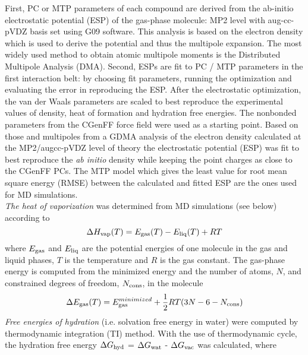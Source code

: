 \documentclass[journal=jacsat,manuscript=article]{achemso}
\begin{document}
 \noindent
 First, PC or MTP parameters of each compound are derived from the ab-initio electrostatic potential (ESP) of the gas-phase molecule: MP2 level with aug-cc-pVDZ basis set using G09 software. This analysis is based on the electron density which is used to derive the potential and thus the multipole expansion. The most widely used method to obtain atomic multipole moments is the Distributed Multipole Analysis (DMA).  Second, ESPs are fit to PC / MTP parameters in the first interaction belt: by choosing fit parameters, running the optimization and evaluating the error in reproducing the ESP.
\noindent
After the electrostatic optimization, the van der Waals parameters are scaled to best reproduce the experimental values of density, heat of formation and hydration free energies. The nonbonded parameters from the CGenFF\cite{cgenff2012} force field were used as a starting point. Based on those and multipoles from a  GDMA analysis\cite{Stone05p1128} of the electron density calculated at the MP2\cite{gordon88mp2}/augcc-pVDZ\cite{dunning89BtoNe,dunning93AltoAr} level of theory the electrostatic potential (ESP) was fit to best reproduce the {\it ab  initio} density while keeping the point charges as close to the CGenFF PCs. The MTP model which gives the least value for root mean square energy (RMSE) between the calculated and fitted ESP are the ones used for MD simulations.  \\
   \noindent
   {\it The heat of vaporization} was determined from MD simulations (see
   below) according to\cite{junmei2011}
   \begin{equation} 
   \label{heat_eqn}
   \Delta H_{\rm vap}(T) = E_{\rm gas}(T) -  E_{\rm liq}(T) + RT
   \end{equation}
   where $E_{\rm gas}$ and $E_{\rm liq}$ are the potential energies of
   one molecule in the gas and liquid phases, $T$ is the temperature and
   $R$ is the gas constant.  The gas-phase energy is computed from the
   minimized energy and the number of atoms, $N$, and constrained degrees
   of freedom, $N_{\rm cons}$, in the molecule
   \begin{equation} 
   \label{heat_eqn2}
   \Delta E_{\rm gas}(T) = E_{\rm gas}^{minimized} +
   \frac{1}{2}RT(3N-6-N_{\rm cons})
   \end{equation}
   {\it Free energies of hydration} (i.e. solvation free energy in water) were
   computed by thermodynamic integration (TI) method. With the use of
   thermodynamic cycle, the hydration free energy $\Delta G_{\rm hyd}$ =
   $\Delta G_{\rm wat}$ - $\Delta G_{\rm vac}$ was calculated, where
\end{document}
